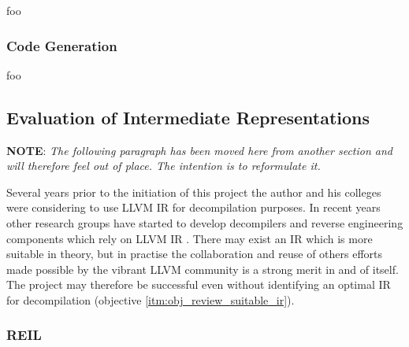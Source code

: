 foo


\subsubsection{Code Generation}

foo


\subsection{Evaluation of Intermediate Representations}




\textbf{NOTE}: \textit{The following paragraph has been moved here from another section and will therefore feel out of place. The intention is to reformulate it.}

Several years prior to the initiation of this project the author and his colleges were considering to use LLVM IR for decompilation purposes. In recent years other research groups have started to develop decompilers and reverse engineering components which rely on LLVM IR \cite{decomp_llvm,retargetable_decomp,mcsema}. There may exist an IR which is more suitable in theory, but in practise the collaboration and reuse of others efforts made possible by the vibrant LLVM community is a strong merit in and of itself. The project may therefore be successful even without identifying an optimal IR for decompilation (objective \ref{itm:obj_review_suitable_ir}).


\subsubsection{REIL}

